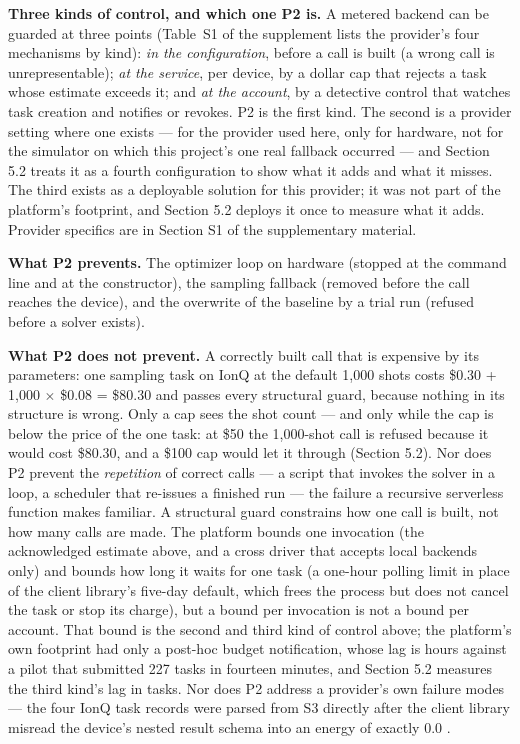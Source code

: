 \documentclass[acmsmall,screen,review]{acmart}
\begin{document}
\textbf{Three kinds of control, and which one P2 is.} A metered backend can be guarded at three points (Table~S1 of the supplement lists the provider's four mechanisms by kind): \textit{in the configuration}, before a call is built (a wrong call is unrepresentable); \textit{at the service}, per device, by a dollar cap that rejects a task whose estimate exceeds it; and \textit{at the account}, by a detective control that watches task creation and notifies or revokes. P2 is the first kind. The second is a provider setting where one exists --- for the provider used here, only for hardware, not for the simulator on which this project's one real fallback occurred --- and Section 5.2 treats it as a fourth configuration to show what it adds and what it misses. The third exists as a deployable solution for this provider; it was not part of the platform's footprint, and Section 5.2 deploys it once to measure what it adds. Provider specifics are in Section S1 of the supplementary material.


\textbf{What P2 prevents.} The optimizer loop on hardware (stopped at the command line and at the constructor), the sampling fallback (removed before the call reaches the device), and the overwrite of the baseline by a trial run (refused before a solver exists).


\textbf{What P2 does not prevent.} A correctly built call that is expensive by its parameters: one sampling task on IonQ at the default 1,000 shots costs \$0.30 + 1,000 $\times$ \$0.08 = \$80.30 and passes every structural guard, because nothing in its structure is wrong. Only a cap sees the shot count --- and only while the cap is below the price of the one task: at \$50 the 1,000-shot call is refused because it would cost \$80.30, and a \$100 cap would let it through (Section 5.2). Nor does P2 prevent the \textit{repetition} of correct calls --- a script that invokes the solver in a loop, a scheduler that re-issues a finished run --- the failure a recursive serverless function makes familiar. A structural guard constrains how one call is built, not how many calls are made. The platform bounds one invocation (the acknowledged estimate above, and a cross driver that accepts local backends only) and bounds how long it waits for one task (a one-hour polling limit in place of the client library's five-day default, which frees the process but does not cancel the task or stop its charge), but a bound per invocation is not a bound per account. That bound is the second and third kind of control above; the platform's own footprint had only a post-hoc budget notification, whose lag is hours against a pilot that submitted 227 tasks in fourteen minutes, and Section 5.2 measures the third kind's lag in tasks. Nor does P2 address a provider's own failure modes --- the four IonQ task records were parsed from S3 directly after the client library misread the device's nested result schema into an energy of exactly 0.0 \cite[Sec. VI-C]{ref1}.
\end{document}
